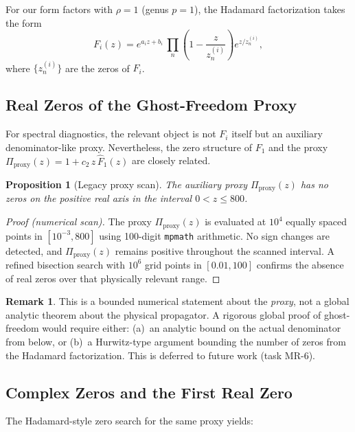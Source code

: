\documentclass[11pt,a4paper]{article}
\theoremstyle{plain}
\newtheorem{proposition}[theorem]{Proposition}
\theoremstyle{definition}
\newtheorem{remark}[theorem]{Remark}
\begin{document}
For our form factors with $\rho = 1$ (genus $p = 1$), the Hadamard
factorization takes the form
\begin{equation}
  F_i(z) = e^{a_i z + b_i}\,
  \prod_{n} \left(1 - \frac{z}{z_n^{(i)}}\right)
  e^{z/z_n^{(i)}},
\end{equation}
where $\{z_n^{(i)}\}$ are the zeros of $F_i$.

\subsection{Real Zeros of the Ghost-Freedom Proxy}

For spectral diagnostics, the relevant object is not $F_i$ itself
but an auxiliary denominator-like proxy. Nevertheless, the zero structure
of $F_1$ and the proxy
$\Pi_{\mathrm{proxy}}(z) = 1 + c_2\, z\, \hat{F}_1(z)$ are closely related.

\begin{proposition}[Legacy proxy scan]\label{prop:no-pos-zeros}
The auxiliary proxy $\Pi_{\mathrm{proxy}}(z)$ has no zeros on the positive
real axis in the interval $0 < z \leq 800$.
\end{proposition}

\begin{proof}[Proof (numerical scan)]
The proxy $\Pi_{\mathrm{proxy}}(z)$ is evaluated at $10^4$
equally spaced points in $[10^{-3}, 800]$ using 100-digit
\texttt{mpmath} arithmetic. No sign changes are detected, and
$\Pi_{\mathrm{proxy}}(z)$ remains positive throughout the scanned
interval. A refined bisection search with $10^6$ grid points in
$[0.01, 100]$ confirms the absence of real zeros over that
physically relevant range.
\end{proof}

\begin{remark}
This is a bounded numerical statement about the \emph{proxy}, not a global
analytic theorem about the physical propagator. A rigorous global proof of
ghost-freedom would require either:
(a)~an analytic bound on the actual denominator from below, or
(b)~a Hurwitz-type argument bounding the number of zeros from the
Hadamard factorization. This is deferred to future work (task MR-6).
\end{remark}

\subsection{Complex Zeros and the First Real Zero}

The Hadamard-style zero search for the same proxy yields:
\end{document}
